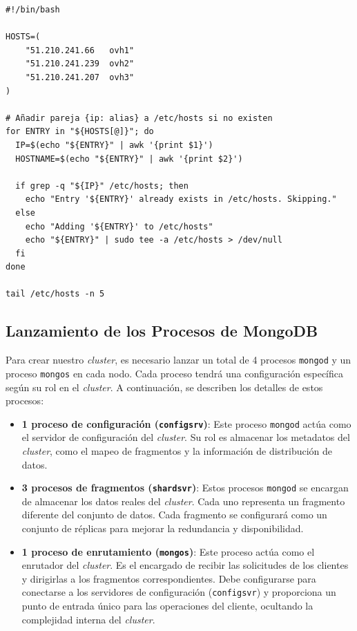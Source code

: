 \begin{verbatim}
#!/bin/bash

HOSTS=(
    "51.210.241.66   ovh1"
    "51.210.241.239  ovh2"
    "51.210.241.207  ovh3"
)

# Añadir pareja {ip: alias} a /etc/hosts si no existen
for ENTRY in "${HOSTS[@]}"; do
  IP=$(echo "${ENTRY}" | awk '{print $1}')
  HOSTNAME=$(echo "${ENTRY}" | awk '{print $2}')
  
  if grep -q "${IP}" /etc/hosts; then
    echo "Entry '${ENTRY}' already exists in /etc/hosts. Skipping."
  else
    echo "Adding '${ENTRY}' to /etc/hosts"
    echo "${ENTRY}" | sudo tee -a /etc/hosts > /dev/null
  fi
done

tail /etc/hosts -n 5
\end{verbatim}

\subsection*{Lanzamiento de los Procesos de MongoDB}

Para crear nuestro \textit{cluster}, es necesario lanzar un total de 4 procesos \texttt{mongod} y un proceso \texttt{mongos} en cada nodo. Cada proceso tendrá una configuración específica según su rol en el \textit{cluster}. A continuación, se describen los detalles de estos procesos:

\begin{itemize}
    \item \textbf{1 proceso de configuración (\texttt{configsrv})}: Este proceso \texttt{mongod} actúa como el servidor de configuración del \textit{cluster}. Su rol es almacenar los metadatos del \textit{cluster}, como el mapeo de fragmentos y la información de distribución de datos.
    \item \textbf{3 procesos de fragmentos (\texttt{shardsvr})}: Estos procesos \texttt{mongod} se encargan de almacenar los datos reales del \textit{cluster}. Cada uno representa un fragmento diferente del conjunto de datos. Cada fragmento se configurará como un conjunto de réplicas para mejorar la redundancia y disponibilidad.
    \item \textbf{1 proceso de enrutamiento (\texttt{mongos})}: Este proceso actúa como el enrutador del \textit{cluster}. Es el encargado de recibir las solicitudes de los clientes y dirigirlas a los fragmentos correspondientes. Debe configurarse para conectarse a los servidores de configuración (\texttt{configsvr}) y proporciona un punto de entrada único para las operaciones del cliente, ocultando la complejidad interna del \textit{cluster}.
\end{itemize}


